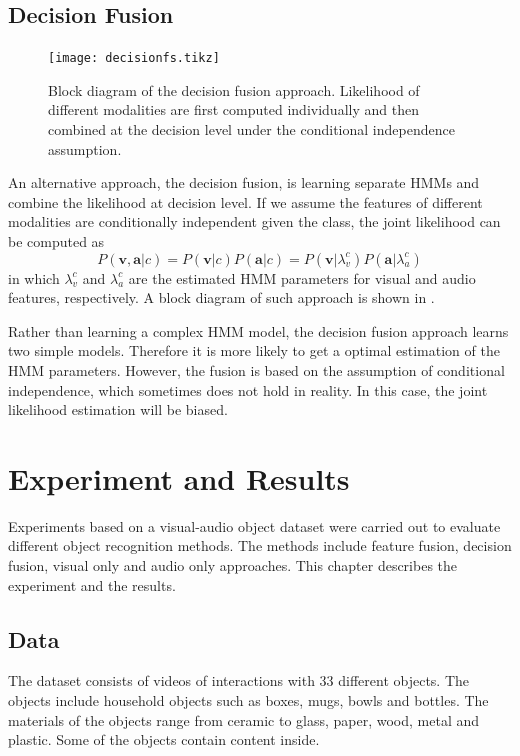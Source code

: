 \documentclass[letterpaper, 10 pt, conference]{ieeeconf}  %
\begin{document}
\subsection{Decision Fusion}
\begin{figure}[t]
  \footnotesize
  \centering
  \texttt{[image: decisionfs.tikz]}
  \caption[Block diagram of the decision fusion approach.]{Block diagram of the decision fusion approach. Likelihood of different modalities are first computed individually and then combined at the decision level under the conditional independence assumption.}
  \label{fig:decisionf}
\end{figure}

An alternative approach, the decision fusion, is learning separate HMMs and combine the likelihood at decision level. If we assume the features of different modalities are conditionally independent given the class, the joint likelihood can be computed as
\begin{equation}
  P(\mathbf{v},\mathbf{a}|c) = P(\mathbf{v}|c) P(\mathbf{a}|c) = P(\mathbf{v}|\lambda_v^c) P(\mathbf{a}|\lambda_a^c)
\end{equation}
in which $\lambda_{v}^c$ and $\lambda_{a}^c$ are the estimated HMM parameters for visual and audio features, respectively. A block diagram of such approach is shown in .

Rather than learning a complex HMM model, the decision fusion approach learns two simple models. Therefore it is more likely to get a optimal estimation of the HMM parameters. However, the fusion is based on the assumption of conditional independence, which sometimes does not hold in reality. In this case, the joint likelihood estimation will be biased.

\section{Experiment and Results}
Experiments based on a visual-audio object dataset were carried out to evaluate different object recognition methods. The methods include feature fusion, decision fusion, visual only and audio only approaches. This chapter describes the experiment and the results.

\subsection{Data}
The dataset consists of videos of interactions with 33 different objects. The objects include household objects such as boxes, mugs, bowls and bottles. The materials of the objects range from ceramic to glass, paper, wood, metal and plastic. Some of the objects contain content inside.
\end{document}
